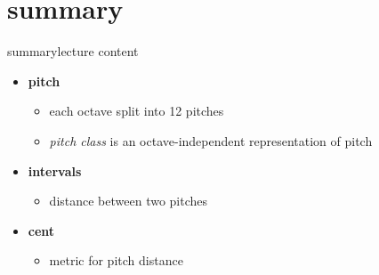     \section{summary}
        \begin{frame}{summary}{lecture content}
            \begin{itemize}
                \item   \textbf{pitch}
                    \begin{itemize}
                        \item   each octave split into 12 pitches
                        \item   \textit{pitch class} is an octave-independent representation of pitch
                    \end{itemize}
                \smallskip
                \item   \textbf{intervals}
                    \begin{itemize}
                        \item   distance between two pitches
                    \end{itemize}
                \smallskip
                \item   \textbf{cent}
                    \begin{itemize}
                        \item   metric for pitch distance
                    \end{itemize}
            \end{itemize}
        \end{frame}

